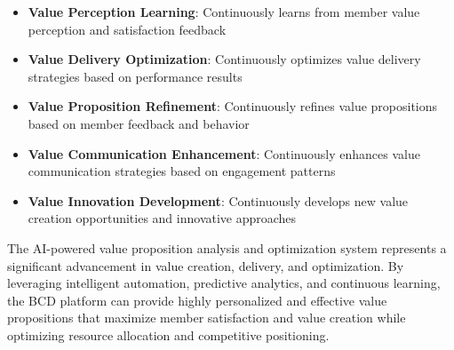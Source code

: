 \begin{itemize}
    \item \textbf{Value Perception Learning}: Continuously learns from member value perception and satisfaction feedback
    \item \textbf{Value Delivery Optimization}: Continuously optimizes value delivery strategies based on performance results
    \item \textbf{Value Proposition Refinement}: Continuously refines value propositions based on member feedback and behavior
    \item \textbf{Value Communication Enhancement}: Continuously enhances value communication strategies based on engagement patterns
    \item \textbf{Value Innovation Development}: Continuously develops new value creation opportunities and innovative approaches
\end{itemize}

The AI-powered value proposition analysis and optimization system represents a significant advancement in value creation, delivery, and optimization. By leveraging intelligent automation, predictive analytics, and continuous learning, the BCD platform can provide highly personalized and effective value propositions that maximize member satisfaction and value creation while optimizing resource allocation and competitive positioning. 


